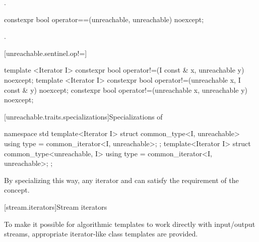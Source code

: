 \begin{addedblock}
\begin{itemdescr}
\pnum
\returns {}.
\end{itemdescr}

\begin{itemdecl}
constexpr bool operator==(unreachable, unreachable) noexcept;
\end{itemdecl}

\begin{itemdescr}
\pnum
\returns {}.
\end{itemdescr}

[unreachable.sentinel.op!=]{}

%
%
\begin{itemdecl}
template <Iterator I>
  constexpr bool operator!=(I const & x, unreachable y) noexcept;
template <Iterator I>
  constexpr bool operator!=(unreachable x, I const & y) noexcept;
constexpr bool operator!=(unreachable x, unreachable y) noexcept;
\end{itemdecl}

\begin{itemdescr}
\pnum
\returns
{}
\end{itemdescr}

[unreachable.traits.specializations]{Specializations of }

%
\begin{itemdecl}
namespace std {
  template<Iterator I>
  struct common_type<I, unreachable> {
    using type = common_iterator<I, unreachable>;
  };
  template<Iterator I>
  struct common_type<unreachable, I> {
    using type = common_iterator<I, unreachable>;
  };
}
\end{itemdecl}

\begin{itemdescr}
\pnum
\enternote By specializing  this way, any iterator and
 can satisfy the  requirement of the
 concept.\exitnote
\end{itemdescr}

\end{addedblock}

[stream.iterators]{Stream iterators}

\pnum
To make it possible for algorithmic templates to work directly with input/output streams, appropriate
iterator-like
class templates
are provided.

